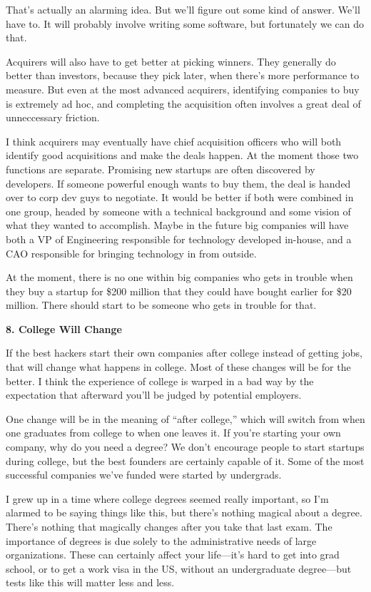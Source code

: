 That's actually an alarming idea. But we'll figure out some kind of
answer. We'll have to. It will probably involve writing some software,
but fortunately we can do that.

Acquirers will also have to get better at picking winners. They
generally do better than investors, because they pick later, when
there's more performance to measure. But even at the most advanced
acquirers, identifying companies to buy is extremely ad hoc, and
completing the acquisition often involves a great deal of unneccessary
friction.

I think acquirers may eventually have chief acquisition officers who
will both identify good acquisitions and make the deals happen. At the
moment those two functions are separate. Promising new startups are
often discovered by developers. If someone powerful enough wants to buy
them, the deal is handed over to corp dev guys to negotiate. It would be
better if both were combined in one group, headed by someone with a
technical background and some vision of what they wanted to accomplish.
Maybe in the future big companies will have both a VP of Engineering
responsible for technology developed in-house, and a CAO responsible for
bringing technology in from outside.

At the moment, there is no one within big companies who gets in trouble
when they buy a startup for \$200 million that they could have bought
earlier for \$20 million. There should start to be someone who gets in
trouble for that.

\textbf{8. College Will Change}

If the best hackers start their own companies after college instead of
getting jobs, that will change what happens in college. Most of these
changes will be for the better. I think the experience of college is
warped in a bad way by the expectation that afterward you'll be judged
by potential employers.

One change will be in the meaning of ``after college,'' which will
switch from when one graduates from college to when one leaves it. If
you're starting your own company, why do you need a degree? We don't
encourage people to start startups during college, but the best founders
are certainly capable of it. Some of the most successful companies we've
funded were started by undergrads.

I grew up in a time where college degrees seemed really important, so
I'm alarmed to be saying things like this, but there's nothing magical
about a degree. There's nothing that magically changes after you take
that last exam. The importance of degrees is due solely to the
administrative needs of large organizations. These can certainly affect
your life---it's hard to get into grad school, or to get a work visa in
the US, without an undergraduate degree---but tests like this will
matter less and less.


